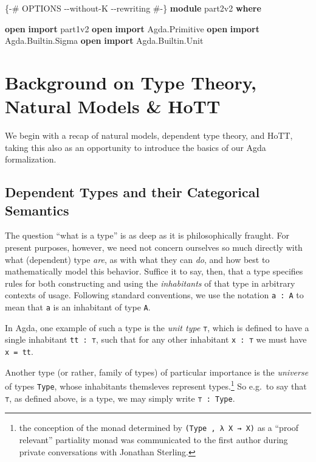\documentclass[
  11pt,
  oneside,
  article]{memoir}
\newenvironment{Shaded}{}{}
\newcommand{\KeywordTok}[1]{\textcolor[rgb]{0.00,0.44,0.13}{\textbf{#1}}}
\newcommand{\NormalTok}[1]{#1}
\newcommand{\OtherTok}[1]{\textcolor[rgb]{0.00,0.44,0.13}{#1}}
\newcommand{\PreprocessorTok}[1]{\textcolor[rgb]{0.74,0.48,0.00}{#1}}
\theoremstyle{definition}
\theoremstyle{plain}
\newcommand{\0}{\textsf{0}}
\newcommand{\1}{\tn{\textsf{1}}}
\begin{document}
\begin{Shaded}
\begin{Highlighting}[]
\PreprocessorTok{\{{-}\# OPTIONS {-}{-}without{-}K {-}{-}rewriting \#{-}\}}
\KeywordTok{module}\NormalTok{ part2v2 }\KeywordTok{where}

\KeywordTok{open} \KeywordTok{import}\NormalTok{ part1v2}
\KeywordTok{open} \KeywordTok{import}\NormalTok{ Agda}\OtherTok{.}\NormalTok{Primitive}
\KeywordTok{open} \KeywordTok{import}\NormalTok{ Agda}\OtherTok{.}\NormalTok{Builtin}\OtherTok{.}\NormalTok{Sigma}
\KeywordTok{open} \KeywordTok{import}\NormalTok{ Agda}\OtherTok{.}\NormalTok{Builtin}\OtherTok{.}\NormalTok{Unit}
\end{Highlighting}
\end{Shaded}

\chapter{Background on Type Theory, Natural Models \&
HoTT}\label{background-on-type-theory-natural-models-hott}

We begin with a recap of natural models, dependent type theory, and
HoTT, taking this also as an opportunity to introduce the basics of our
Agda formalization.

\section{Dependent Types and their Categorical
Semantics}\label{dependent-types-and-their-categorical-semantics}

The question ``what is a type'' is as deep as it is philosophically
fraught. For present purposes, however, we need not concern ourselves so
much directly with what (dependent) type \emph{are}, as with what they
can \emph{do}, and how best to mathematically model this behavior.
Suffice it to say, then, that a type specifies rules for both
constructing and using the \emph{inhabitants} of that type in arbitrary
contexts of usage. Following standard conventions, we use the notation
\texttt{a\ :\ A} to mean that \texttt{a} is an inhabitant of type
\texttt{A}.

In Agda, one example of such a type is the \emph{unit type} \texttt{⊤},
which is defined to have a single inhabitant \texttt{tt\ :\ ⊤}, such
that for any other inhabitant \texttt{x\ :\ ⊤} we must have
\texttt{x\ =\ tt}.

Another type (or rather, family of types) of particular importance is
the \emph{universe} of types \texttt{Type}, whose inhabitants themsleves
represent types.\footnote{the conception of the monad determined by
  \texttt{(Type\ ,\ λ\ X\ →\ X)} as a ``proof relevant'' partiality
  monad was communicated to the first author during private
  conversations with Jonathan Sterling.} So e.g.~to say that \texttt{⊤},
as defined above, is a type, we may simply write \texttt{⊤\ :\ Type}.
\end{document}
